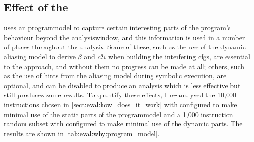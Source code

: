 \subsection{Effect of the }

{\technique} uses an \gls{programmodel} to capture certain interesting
parts of the program's behaviour beyond the \gls{analysiswindow}, and
this information is used in a number of places throughout the
analysis.  Some of these, such as the use of the dynamic aliasing
model to derive $\beta$ and $c2i$ when building the interfering
\glspl{cfg}, are essential to the approach, and without them no
progress can be made at all; others, such as the use of hints from the
aliasing model during symbolic execution, are optional, and can be
disabled to produce an analysis which is less effective but still
produces some results.  To quantify these effects, I re-analysed the
10,000 instructions chosen in \autoref{sect:eval:how_does_it_work}
with {\technique} configured to make minimal use of the static
parts of the \gls{programmodel} and a 1,000 instruction random subset
with {\technique} configured to make minimal use of the dynamic
parts.  The results are shown in \autoref{tab:eval:why:program_model}.

